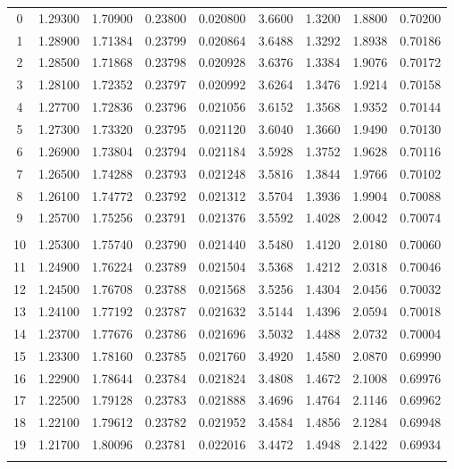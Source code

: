 \documentclass[letter,twosides,10pt]{article}
\begin{document}
\begin{longtable}{|c|c|c|c|c|c|c|c|c|}
  0 & 1.29300 & 1.70900 & 0.23800 & 0.020800 & 3.6600 & 1.3200 & 1.8800 & 0.70200 \\
  1 & 1.28900 & 1.71384 & 0.23799 & 0.020864 & 3.6488 & 1.3292 & 1.8938 & 0.70186 \\
  2 & 1.28500 & 1.71868 & 0.23798 & 0.020928 & 3.6376 & 1.3384 & 1.9076 & 0.70172 \\
  3 & 1.28100 & 1.72352 & 0.23797 & 0.020992 & 3.6264 & 1.3476 & 1.9214 & 0.70158 \\
  4 & 1.27700 & 1.72836 & 0.23796 & 0.021056 & 3.6152 & 1.3568 & 1.9352 & 0.70144 \\
  5 & 1.27300 & 1.73320 & 0.23795 & 0.021120 & 3.6040 & 1.3660 & 1.9490 & 0.70130 \\
  6 & 1.26900 & 1.73804 & 0.23794 & 0.021184 & 3.5928 & 1.3752 & 1.9628 & 0.70116 \\
  7 & 1.26500 & 1.74288 & 0.23793 & 0.021248 & 3.5816 & 1.3844 & 1.9766 & 0.70102 \\
  8 & 1.26100 & 1.74772 & 0.23792 & 0.021312 & 3.5704 & 1.3936 & 1.9904 & 0.70088 \\
  9 & 1.25700 & 1.75256 & 0.23791 & 0.021376 & 3.5592 & 1.4028 & 2.0042 & 0.70074 \\
 & & & & & & & & \\
 10 & 1.25300 & 1.75740 & 0.23790 & 0.021440 & 3.5480 & 1.4120 & 2.0180 & 0.70060 \\
 11 & 1.24900 & 1.76224 & 0.23789 & 0.021504 & 3.5368 & 1.4212 & 2.0318 & 0.70046 \\
 12 & 1.24500 & 1.76708 & 0.23788 & 0.021568 & 3.5256 & 1.4304 & 2.0456 & 0.70032 \\
 13 & 1.24100 & 1.77192 & 0.23787 & 0.021632 & 3.5144 & 1.4396 & 2.0594 & 0.70018 \\
 14 & 1.23700 & 1.77676 & 0.23786 & 0.021696 & 3.5032 & 1.4488 & 2.0732 & 0.70004 \\
 15 & 1.23300 & 1.78160 & 0.23785 & 0.021760 & 3.4920 & 1.4580 & 2.0870 & 0.69990 \\
 16 & 1.22900 & 1.78644 & 0.23784 & 0.021824 & 3.4808 & 1.4672 & 2.1008 & 0.69976 \\
 17 & 1.22500 & 1.79128 & 0.23783 & 0.021888 & 3.4696 & 1.4764 & 2.1146 & 0.69962 \\
 18 & 1.22100 & 1.79612 & 0.23782 & 0.021952 & 3.4584 & 1.4856 & 2.1284 & 0.69948 \\
 19 & 1.21700 & 1.80096 & 0.23781 & 0.022016 & 3.4472 & 1.4948 & 2.1422 & 0.69934 \\
 & & & & & & & & \\

\end{longtable}
\end{document}
